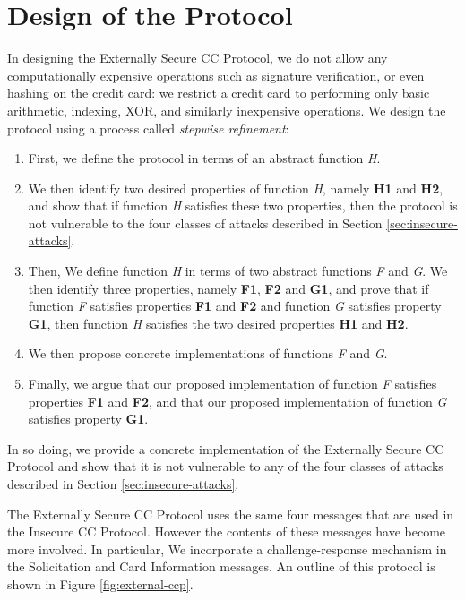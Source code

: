 \section{Design of the Protocol}
\label{sec:external-design}

In designing the Externally Secure CC Protocol, we do not allow any computationally expensive operations such as signature verification, or even hashing on the credit card:
	we restrict a credit card to performing only basic arithmetic, indexing, XOR, and similarly inexpensive operations.
We design the protocol using a process called \emph{stepwise refinement}:
\begin{enumerate}
\item First, we define the protocol in terms of an abstract function \emph{H}.
\item We then identify two desired properties of function \emph{H}, namely \textbf{H1} and \textbf{H2},
	and show that if function \emph{H} satisfies these two properties,
	then the protocol is not vulnerable to the four classes of attacks described in Section \ref{sec:insecure-attacks}.
\item Then, We define function \emph{H} in terms of two abstract functions \emph{F} and \emph{G}.
We then identify three properties, namely \textbf{F1}, \textbf{F2} and \textbf{G1},
	and prove that if function \emph{F} satisfies properties \textbf{F1} and \textbf{F2}
	and function \emph{G} satisfies property \textbf{G1}, then function \emph{H} satisfies the two desired properties \textbf{H1} and \textbf{H2}.
\item We then propose concrete implementations of functions \emph{F} and \emph{G}.
\item Finally, we argue that our proposed implementation of function \emph{F} satisfies properties \textbf{F1} and \textbf{F2},
	and that our proposed implementation of function \emph{G} satisfies property \textbf{G1}.
\end{enumerate}

In so doing, we provide a concrete implementation of the Externally Secure CC Protocol
	and show that it is not vulnerable to any of the four classes of attacks described in Section \ref{sec:insecure-attacks}.

The Externally Secure CC Protocol uses the same four messages that are used in the Insecure CC Protocol.
However the contents of these messages have become more involved.
In particular, We incorporate a challenge-response mechanism in the Solicitation and Card Information messages.
An outline of this protocol is shown in Figure \ref{fig:external-ccp}.

